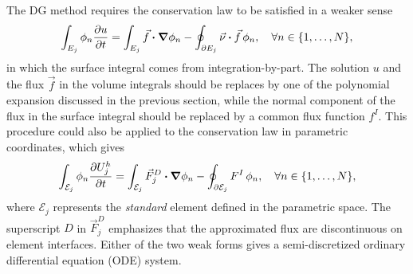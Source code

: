 \documentclass[10pt,draft]{article}
\begin{document}
%
The DG method requires the conservation law to be satisfied in a weaker sense
$$
\int_{E_j}\phi_n\pdv{u}{t}
=\int_{E_j}\vec{f}\vdot\grad\phi_n
-\oint_{\partial E_j}\vec{\nu}\vdot\vec{f}\,\phi_n,\quad \forall n\in\{1,\dots,N\},
$$
in which the surface integral comes from integration-by-part.
%
The solution $u$ and the flux $\vec{f}$ in the volume integrals should be replaces by one of the polynomial expansion discussed in the previous section,
while the normal component of the flux in the surface integral should be replaced by a common flux function $f^{I}$.
%
This procedure could also be applied to the conservation law in parametric coordinates, which gives
$$
\int_{\mathcal{E}_j}\phi_{n}\pdv{U_j^{h}}{t}=\int_{\mathcal{E}_j}\vec{F}_j^{D}\vdot\grad\phi_{n}-\oint_{\partial\mathcal{E}_j}F^{I}\,\phi_{n},\quad\forall n\in\{1,\dots,N\},
$$
where $\mathcal{E}_j$ represents the \emph{standard} element defined in the parametric space.
%
The superscript $D$ in $\vec{F}_j^{D}$ emphasizes that the approximated flux are discontinuous on element interfaces.
%
Either of the two weak forms gives a semi-discretized ordinary differential equation (ODE) system.
\end{document}
